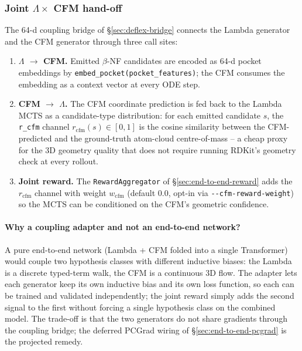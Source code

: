 \subsubsection{Joint $\Lambda \times$ CFM hand-off}
\label{sec:end-to-end-coupling}

The 64-d coupling bridge of
\S\ref{sec:deflex-bridge} connects the Lambda generator and
the CFM generator through three call sites:

\begin{enumerate}
  \item \textbf{$\Lambda$ $\to$ CFM.}  Emitted $\beta$-NF
        candidates are encoded as 64-d pocket embeddings by
        \texttt{embed\_pocket(pocket\_features)}; the CFM
        consumes the embedding as a context vector at every
        ODE step.

  \item \textbf{CFM $\to$ $\Lambda$.}  The CFM coordinate
        prediction is fed back to the Lambda MCTS as a
        candidate-type distribution: for each emitted
        candidate $s$, the \texttt{r\_cfm} channel
        $r_{\mathrm{cfm}}(s) \in [0,1]$ is the cosine
        similarity between the CFM-predicted and the
        ground-truth atom-cloud centre-of-mass -- a cheap
        proxy for the 3D geometry quality that does not
        require running RDKit's geometry check at every
        rollout.

  \item \textbf{Joint reward.}  The
        \texttt{RewardAggregator} of
        \S\ref{sec:end-to-end-reward} adds the $r_{\mathrm{cfm}}$
        channel with weight $w_{\mathrm{cfm}}$ (default $0.0$,
        opt-in via \texttt{-{}-cfm-reward-weight}) so the MCTS
        can be conditioned on the CFM's geometric confidence.
\end{enumerate}

\paragraph{Why a coupling adapter and not an end-to-end network?}
A pure end-to-end network (Lambda + CFM folded into a
single Transformer) would couple two hypothesis classes with
different inductive biases: the Lambda is a discrete
typed-term walk, the CFM is a continuous 3D flow.  The
adapter lets each generator keep its own inductive bias and
its own loss function, so each can be trained and validated
independently; the joint reward simply adds the second
signal to the first without forcing a single hypothesis
class on the combined model.  The trade-off is that the two
generators do not share gradients through the coupling
bridge; the deferred PCGrad wiring of
\S\ref{sec:end-to-end-pcgrad} is the projected remedy.

